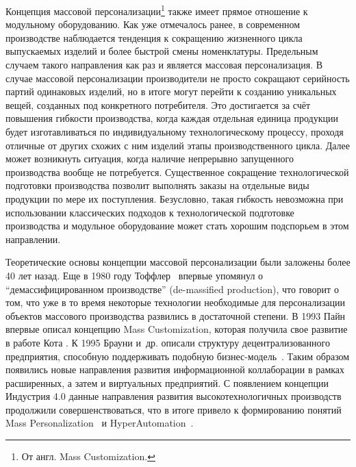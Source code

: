 Концепция массовой персонализации\footnote{От англ. Mass Customization.} также имеет прямое отношение к модульному оборудованию. Как уже отмечалось ранее, в современном производстве наблюдается тенденция к сокращению жизненного цикла выпускаемых изделий и более быстрой смены номенклатуры. Предельным случаем такого направления как раз и является массовая персонализация. В случае массовой персонализации производители не просто сокращают серийность партий одинаковых изделий, но в итоге могут перейти к созданию уникальных вещей, созданных под конкретного потребителя. Это достигается за счёт повышения гибкости производства, когда каждая отдельная единица продукции будет изготавливаться по индивидуальному технологическому процессу, проходя отличные от других схожих с ним изделий этапы производственного цикла. Далее может возникнуть ситуация, когда наличие непрерывно запущенного производства вообще не потребуется. Существенное сокращение технологической подготовки производства позволит выполнять заказы на отдельные виды продукции по мере их поступления. Безусловно, такая гибкость невозможна при использовании классических подходов к технологической подготовке производства и модульное оборудование может стать хорошим подспорьем в этом направлении.

Теоретические основы концепции массовой персонализации были заложены более 40 лет назад. Еще в 1980 году Тоффлер~\cite{toffler1980third} впервые упомянул о ``демассифицированном производстве'' (de-massified production), что говорит о том, что уже в то время некоторые технологии необходимые для персонализации объектов массового производства развились в достаточной степени. В 1993 Пайн~\cite{pine1993mass} впервые описал концепцию Mass Customization, которая получила свое развитие в работе Кота \cite{kotha1995mass}. К 1995 Брауни и~др. описали структуру децентрализованного предприятия, способную поддерживать подобную бизнес-модель~\cite{browne1995future}. Таким образом появились новые направления развития информационной коллаборации в рамках расширенных, а затем и виртуальных предприятий. С появлением концепции Индустрия 4.0 данные направления развития высокотехнологичных производств продолжили совершенствоваться, что в итоге привело к формированию понятий Mass Personalization~\cite{chen2009mass} и HyperAutomation~\cite{park2018fourth}.


